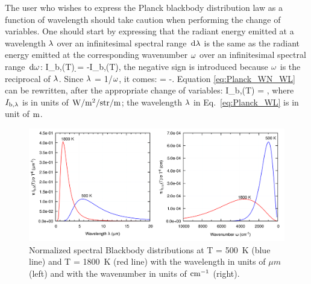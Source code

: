The user who wishes to express the Planck blackbody distribution law as a function of wavelength should take caution when performing the change of variables. One should start by expressing that the radiant energy emitted at a wavelength $\lambda$ over an infinitesimal spectral range $\,\mathrm{d}\lambda$ is the same as the radiant energy emitted at the corresponding wavenumber $\omega$ over an infinitesimal spectral range $\,\mathrm{d}\omega$:
\be \label{eq:Planck_WN_WL}
I_{\rm b,\la}(T) \d \la = -I_{\rm b,\om}(T)\d \om,
\ee
the negative sign is introduced because $\omega$ is the reciprocal of $\lambda$. Since $\lambda$ = 1/$\omega$, it comes:
\be
\dfrac{\d \la}{\d \om} = -.
\ee
Equation \ref{eq:Planck_WN_WL} can be rewritten, after the appropriate change of variables:
\be \label{eq:Planck_WL}
I_{\rm b,\la}(T) = ,
\ee
where $I_{\rm b,\lambda}$ is in units of $\rm{W/m^2/str/m}$; the wavelength $\lambda$ in Eq.~\ref{eq:Planck_WL} is in unit of $\rm m$.

\begin{figure}
\begin{center}
 \includegraphics[width=6.5in]{Figures/Black_body.png}
\end{center}
 \caption{Normalized spectral Blackbody distributions at T = 500~K (blue line) and T = 1800~K (red line) with the wavelength in units of $\mu m$ (left) and with the wavenumber in units of $\rm cm^{-1}$ (right). \label{fig:bb_spectrum}}
\end{figure}

